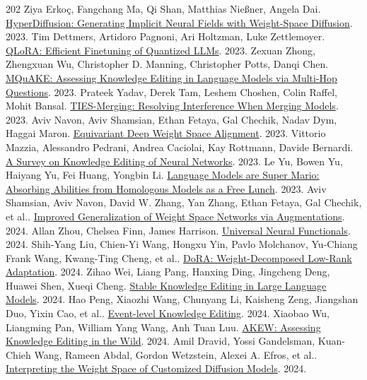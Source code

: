 \begin{thebibliography}{202}
 Ziya Erkoç, Fangchang Ma, Qi Shan, Matthias Nießner, Angela Dai. \href{https://arxiv.org/abs/2303.17015v1}{HyperDiffusion: Generating Implicit Neural Fields with Weight-Space Diffusion}. 2023.
 Tim Dettmers, Artidoro Pagnoni, Ari Holtzman, Luke Zettlemoyer. \href{https://arxiv.org/abs/2305.14314v1}{QLoRA: Efficient Finetuning of Quantized LLMs}. 2023.
 Zexuan Zhong, Zhengxuan Wu, Christopher D. Manning, Christopher Potts, Danqi Chen. \href{https://arxiv.org/abs/2305.14795v3}{MQuAKE: Assessing Knowledge Editing in Language Models via Multi-Hop Questions}. 2023.
 Prateek Yadav, Derek Tam, Leshem Choshen, Colin Raffel, Mohit Bansal. \href{https://arxiv.org/abs/2306.01708v2}{TIES-Merging: Resolving Interference When Merging Models}. 2023.
 Aviv Navon, Aviv Shamsian, Ethan Fetaya, Gal Chechik, Nadav Dym, Haggai Maron. \href{https://arxiv.org/abs/2310.13397v4}{Equivariant Deep Weight Space Alignment}. 2023.
 Vittorio Mazzia, Alessandro Pedrani, Andrea Caciolai, Kay Rottmann, Davide Bernardi. \href{https://arxiv.org/abs/2310.19704}{A Survey on Knowledge Editing of Neural Networks}. 2023.
 Le Yu, Bowen Yu, Haiyang Yu, Fei Huang, Yongbin Li. \href{https://arxiv.org/abs/2311.03099v3}{Language Models are Super Mario: Absorbing Abilities from Homologous Models as a Free Lunch}. 2023.
 Aviv Shamsian, Aviv Navon, David W. Zhang, Yan Zhang, Ethan Fetaya, Gal Chechik, et al.. \href{https://arxiv.org/abs/2402.04081v2}{Improved Generalization of Weight Space Networks via Augmentations}. 2024.
 Allan Zhou, Chelsea Finn, James Harrison. \href{https://arxiv.org/abs/2402.05232v1}{Universal Neural Functionals}. 2024.
 Shih-Yang Liu, Chien-Yi Wang, Hongxu Yin, Pavlo Molchanov, Yu-Chiang Frank Wang, Kwang-Ting Cheng, et al.. \href{https://arxiv.org/abs/2402.09353v6}{DoRA: Weight-Decomposed Low-Rank Adaptation}. 2024.
 Zihao Wei, Liang Pang, Hanxing Ding, Jingcheng Deng, Huawei Shen, Xueqi Cheng. \href{https://arxiv.org/abs/2402.13048v1}{Stable Knowledge Editing in Large Language Models}. 2024.
 Hao Peng, Xiaozhi Wang, Chunyang Li, Kaisheng Zeng, Jiangshan Duo, Yixin Cao, et al.. \href{https://arxiv.org/abs/2402.13093v2}{Event-level Knowledge Editing}. 2024.
 Xiaobao Wu, Liangming Pan, William Yang Wang, Anh Tuan Luu. \href{https://arxiv.org/abs/2402.18909v2}{AKEW: Assessing Knowledge Editing in the Wild}. 2024.
 Amil Dravid, Yossi Gandelsman, Kuan-Chieh Wang, Rameen Abdal, Gordon Wetzstein, Alexei A. Efros, et al.. \href{https://arxiv.org/abs/2406.09413v3}{Interpreting the Weight Space of Customized Diffusion Models}. 2024.

\end{thebibliography}
